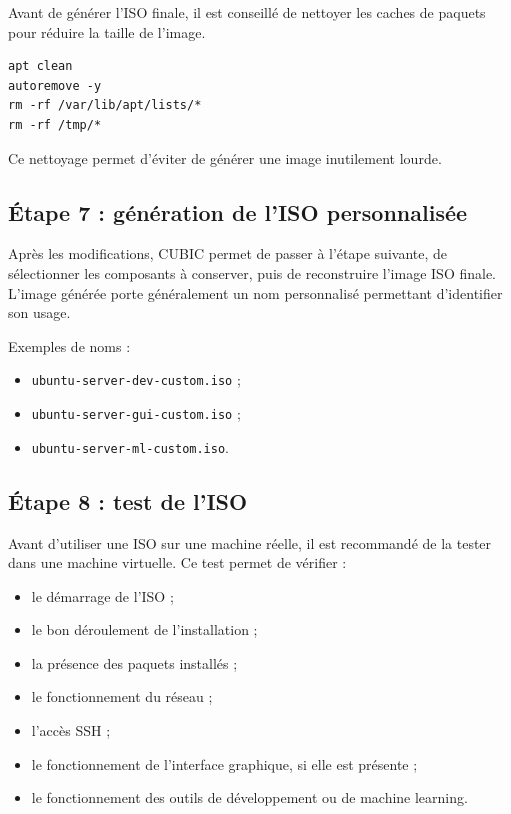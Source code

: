 \documentclass[12pt,a4paper]{article}
\begin{document}
Avant de générer l'ISO finale, il est conseillé de nettoyer les caches de paquets pour réduire la taille de l'image.

\begin{lstlisting}
apt clean
autoremove -y
rm -rf /var/lib/apt/lists/*
rm -rf /tmp/*
\end{lstlisting}

Ce nettoyage permet d'éviter de générer une image inutilement lourde.

\subsection{Étape 7 : génération de l'ISO personnalisée}

Après les modifications, CUBIC permet de passer à l'étape suivante, de sélectionner les composants à conserver, puis de reconstruire l'image ISO finale. L'image générée porte généralement un nom personnalisé permettant d'identifier son usage.

Exemples de noms :

\begin{itemize}[label=--]
    \item \texttt{ubuntu-server-dev-custom.iso} ;
    \item \texttt{ubuntu-server-gui-custom.iso} ;
    \item \texttt{ubuntu-server-ml-custom.iso}.
\end{itemize}

\subsection{Étape 8 : test de l'ISO}

Avant d'utiliser une ISO sur une machine réelle, il est recommandé de la tester dans une machine virtuelle. Ce test permet de vérifier :

\begin{itemize}[label=--]
    \item le démarrage de l'ISO ;
    \item le bon déroulement de l'installation ;
    \item la présence des paquets installés ;
    \item le fonctionnement du réseau ;
    \item l'accès SSH ;
    \item le fonctionnement de l'interface graphique, si elle est présente ;
    \item le fonctionnement des outils de développement ou de machine learning.
\end{itemize}
\end{document}
